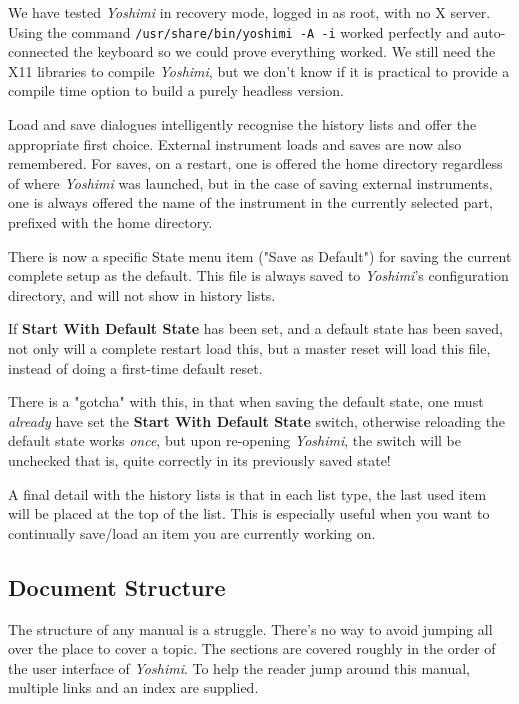 \documentclass[
 11pt,
 twoside,
 a4paper,
 final                                 %
]{article}
\begin{document}
   We have tested \textsl{Yoshimi} in recovery mode, logged in as root, with
   no X server. Using the command \texttt{/usr/share/bin/yoshimi -A -i}
   worked perfectly and auto-connected the keyboard so we could prove
   everything worked.  We still need the X11 libraries to compile
   \textsl{Yoshimi}, but we don't know if it is practical to provide a compile
   time option to build a purely headless version.

   Load and save dialogues intelligently recognise the history lists and offer
   the appropriate first choice. External instrument loads and saves are now
   also remembered.
   For saves, on a restart, one is offered the home directory regardless
   of where \textsl{Yoshimi} was launched, but in the case of saving
   external instruments, one is always offered the name of the instrument
   in the currently selected part, prefixed with the home directory.

   There is now a specific State menu item ("Save as Default") for saving
   the current complete setup as the default. This file is always saved to
   \textsl{Yoshimi}'s configuration directory,
   and will not show in history lists.

   If \textbf{Start With Default State} has been set, and a
   default state has been saved, not only will a complete restart load this,
   but a master reset will load this file, instead of doing a
   first-time default reset.

   There is a "gotcha" with this, in that when saving the default state,
   one must \textsl{already} have set the \textbf{Start With Default State}
   switch, otherwise reloading
   the default state works \textsl{once}, but upon re-opening
   \textsl{Yoshimi}, the switch will be
   unchecked \textemdash that is, quite correctly in its previously saved state!

   A final detail with the history lists is that in each list type, the last
   used item will be placed at the top of the list. This is especially useful
   when you want to continually save/load an item you are currently working on.

\subsection{Document Structure}
\label{subsec:introduction_document_structure}

   The structure of any manual is a struggle.
   There's no way to avoid jumping all over the place to
   cover a topic.  The sections are covered roughly
   in the order of the user interface of
   \textsl{Yoshimi}.  To help the reader jump around this manual, multiple
   links and an index are supplied.
\end{document}
